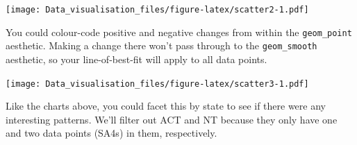 \documentclass[]{book}
\newenvironment{Shaded}{\begin{snugshade}}{\end{snugshade}}
\newcommand{\CommentTok}[1]{\textcolor[rgb]{0.56,0.35,0.01}{\textit{#1}}}
\newcommand{\DataTypeTok}[1]{\textcolor[rgb]{0.13,0.29,0.53}{#1}}
\newcommand{\DecValTok}[1]{\textcolor[rgb]{0.00,0.00,0.81}{#1}}
\newcommand{\KeywordTok}[1]{\textcolor[rgb]{0.13,0.29,0.53}{\textbf{#1}}}
\newcommand{\NormalTok}[1]{#1}
\newcommand{\OperatorTok}[1]{\textcolor[rgb]{0.81,0.36,0.00}{\textbf{#1}}}
\newcommand{\StringTok}[1]{\textcolor[rgb]{0.31,0.60,0.02}{#1}}
\begin{document}
\texttt{[image: Data\_visualisation\_files/figure-latex/scatter2-1.pdf]}

You could colour-code positive and negative changes from within the \texttt{geom\_point} aesthetic. Making a change there won't pass through to the \texttt{geom\_smooth} aesthetic, so your line-of-best-fit will apply to all data points.

\begin{Shaded}
\end{Shaded}

\texttt{[image: Data\_visualisation\_files/figure-latex/scatter3-1.pdf]}

Like the charts above, you could facet this by state to see if there were any interesting patterns. We'll filter out ACT and NT because they only have one and two data points (SA4s) in them, respectively.
\end{document}
